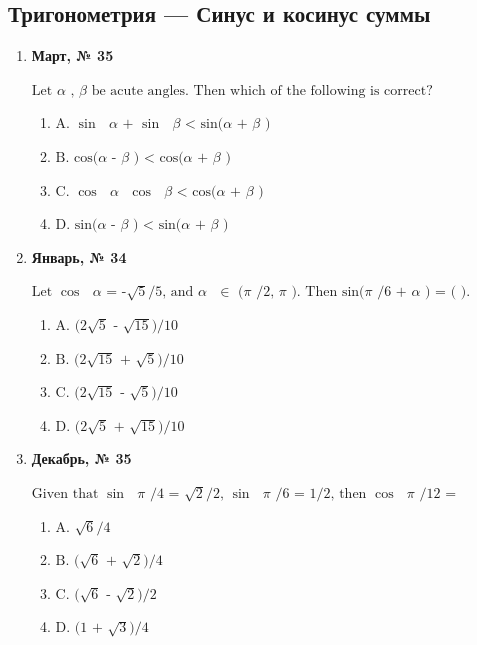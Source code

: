 \subsection*{Тригонометрия — Синус и косинус суммы}
\begin{enumerate}
\item \textbf{Март, № 35} \par \smallskip
$\displaystyle \text{Let }\alpha\text{ , }\beta\text{  be acute angles. Then which of the following is correct?}$
\begin{enumerate}
\item $\displaystyle \text{A. }\sin\text{ }\alpha\text{  + }\sin\text{ }\beta\text{  < sin(}\alpha\text{  + }\beta\text{ )}$
\item $\displaystyle \text{B. cos(}\alpha\text{  - }\beta\text{ ) < cos(}\alpha\text{  + }\beta\text{ )}$
\item $\displaystyle \text{C. }\cos\text{ }\alpha\text{  }\cos\text{ }\beta\text{  < cos(}\alpha\text{  + }\beta\text{ )}$
\item $\displaystyle \text{D. sin(}\alpha\text{  - }\beta\text{ ) < sin(}\alpha\text{  + }\beta\text{ )}$
\end{enumerate}
\item \textbf{Январь, № 34} \par \smallskip
$\displaystyle \text{Let }\cos\text{ }\alpha\text{  = -}\sqrt{5}\text{/5, and }\alpha\text{  }\in\text{  (}\pi\text{ /2, }\pi\text{ ). Then sin(}\pi\text{ /6 + }\alpha\text{ ) = ( ).}$
\begin{enumerate}
\item $\displaystyle \text{A. (2}\sqrt{5}\text{ - }\sqrt{15}\text{)/10}$
\item $\displaystyle \text{B. (2}\sqrt{15}\text{ + }\sqrt{5}\text{)/10}$
\item $\displaystyle \text{C. (2}\sqrt{15}\text{ - }\sqrt{5}\text{)/10}$
\item $\displaystyle \text{D. (2}\sqrt{5}\text{ + }\sqrt{15}\text{)/10}$
\end{enumerate}
\item \textbf{Декабрь, № 35} \par \smallskip
$\displaystyle \text{Given that }\sin\text{ }\pi\text{ /4 = }\sqrt{2}\text{/2, }\sin\text{ }\pi\text{ /6 = 1/2, then }\cos\text{ }\pi\text{ /12 =}$
\begin{enumerate}
\item $\displaystyle \text{A. }\sqrt{6}\text{/4}$
\item $\displaystyle \text{B. (}\sqrt{6}\text{ + }\sqrt{2}\text{)/4}$
\item $\displaystyle \text{C. (}\sqrt{6}\text{ - }\sqrt{2}\text{)/2}$
\item $\displaystyle \text{D. (1 + }\sqrt{3}\text{)/4}$
\end{enumerate}
\end{enumerate}

